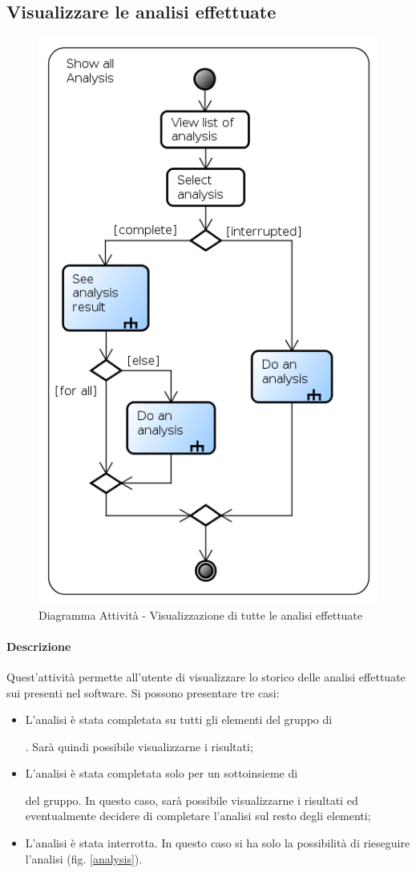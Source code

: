 \subsection{Visualizzare le analisi effettuate}
\label{ShowAll}
\begin{figure}[!h]
\centering
\includegraphics[width=0.6\linewidth]{./Content/Immagini/Show_All}
\caption{Diagramma Attività - Visualizzazione di tutte le analisi effettuate}
\label{showA}
\end{figure}
\paragraph{Descrizione\\}
Quest'attività permette all'utente di visualizzare lo storico delle analisi effettuate sui \dataset{} presenti nel software. Si possono presentare tre casi:
\begin{itemize}
\item L'analisi è stata completata su tutti gli elementi del gruppo di \subject{}. Sarà quindi possibile visualizzarne i risultati;
\item L'analisi è stata completata solo per un sottoinsieme di \subject{} del gruppo. In questo caso, sarà possibile visualizzarne i risultati ed eventualmente decidere di completare l'analisi sul resto degli elementi;
\item L'analisi è stata interrotta. In questo caso si ha solo la possibilità di rieseguire l'analisi (fig. \ref{analysis}).
\end{itemize}
\pagebreak

